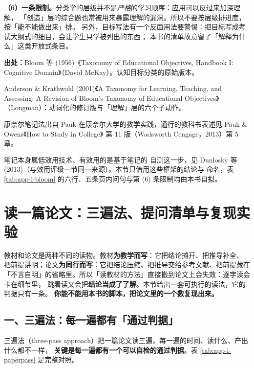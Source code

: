 \textbf{（6）一条限制。}分类学的层级并不是\emph{严格}的学习顺序：应用可以反过来加深理解，
「创造」层的综合题也常被用来暴露理解的漏洞。所以不要按层级排进度，按「能不能做出来」排。
另外，目标写法有一个反面用法要警惕：把目标写成考试大纲式的细目，会让学生只学被列出的东西；
本书的清单故意留了「解释为什么」这类开放式条目。

{\footnotesize
\textbf{出处：}Bloom 等 (1956)《Taxonomy of Educational Objectives, Handbook I: Cognitive
Domain》（David McKay）。认知目标分类的原始版本。

Anderson \& Krathwohl (2001)《A Taxonomy
for Learning, Teaching, and Assessing: A Revision of Bloom's Taxonomy of Educational
Objectives》（Longman）：动词化的修订版与「理解」层的六个子动作。

康奈尔笔记法出自 Pauk
在康奈尔大学的教学实践，通行的教科书表述见 Pauk \& Owens《How to Study in College》
第 11 版（Wadsworth Cengage，2013）第 5 章。

笔记本身属低效用技术、有效用的是基于笔记的
自测这一步，见 Dunlosky 等 (2013)（与效用评级一节同一来源）。本节只借用这些框架的结论与
命名，表 \ref{tab:app-i-bloom} 的六行、五条页内问句与第 (6) 条限制均由本书自拟。
}

\section{读一篇论文：三遍法、提问清单与复现实验}
\label{sec:app-i-paper}

教材和论文是两种不同的读物。教材\textbf{为教学而写}：它把结论摊开、把推导补全、
把前提讲明；论文\textbf{为同行而写}：它把结论压缩、把推导交给参考文献、把前提藏在「不言自明」的省略里。所以「读教材的方法」直接搬到论文上会失效：逐字读会卡在细节里，
跳着读又会把\textbf{结论当成了了解}。本节给出一套可执行的读法，它的判据只有一条。
\textbf{你能不能用本书的脚本，把论文里的一个数复现出来。}

\subsection*{一、三遍法：每一遍都有「通过判据」}

三遍法（three-pass approach）把一篇论文读三遍，每一遍的时间、读什么、产出什么都不一样，
\textbf{关键是每一遍都有一个可以自检的通过判据}。表 \ref{tab:app-i-paperpass} 是完整对照。

